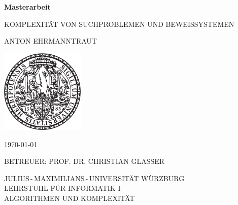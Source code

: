 \pagestyle{empty}

\begin{center}{

\vfill\sffamily

{\Large\textbf{Masterarbeit}}\par
    \vspace*{1cm}
{\huge{KOMPLEXITÄT VON SUCHPROBLEMEN UND BEWEISSYSTEMEN}}\par
    \vspace*{.3cm}
{\Large{ANTON EHRMANNTRAUT}}\par}
\vspace*{6cm}

\includegraphics[width=4cm]{siegel.pdf}

\vspace*{4cm}


\bgroup\sffamily{}
{\large\MakeUppercase{\today}}\vspace*{.7cm}

{\large BETREUER: PROF. DR. CHRISTIAN GLASSER}\vspace*{.5cm}


{\large
JULIUS\,-\,MAXIMILIANS\,-\,UNIVERSITÄT WÜRZBURG\\
LEHRSTUHL FÜR INFORMATIK I\\
ALGORITHMEN UND KOMPLEXITÄT
}
\egroup


\end{center}

\cleardoublepage
\restoregeometry

\tableofcontents
\thispagestyle{empty}
\cleardoublepage
{}
\pagestyle{main}

